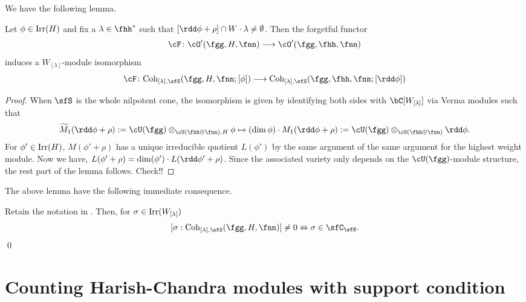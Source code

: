 \documentclass[counting_main.tex]{subfiles}
\begin{document}
We have the following lemma.
\begin{lem}
  Let $\phi\in \mathrm{Irr}(H)$ and fix a $\lambda\in \fhh^{*}$ such that
  $[\rdd \phi + \rho ]\cap W\cdot \lambda\neq \emptyset$.
  Then the forgetful functor
  \[
    \cF\colon \cO'(\fgg,H,\fnn)\longrightarrow \cO'(\fgg,\fhh,\fnn)
  \]
  induces a $W_{[\lambda]}$-module isomorphism
  \[
    \cF\colon \Coh_{[\lambda],\sfS}(\fgg,H,\fnn;[\phi])\longrightarrow
    \Coh_{[\lambda],\sfS}(\fgg,\fhh,\fnn;[\rdd\phi])
  \]
\end{lem}
\begin{proof}
  When $\sfS$ is the whole nilpotent cone, the isomorphism is
  given by identifying both sides with $\bC[W_{[\lambda]}]$ via Verma modules
  such that
  \[
  \wtM_{1}(\rdd \phi+\rho):=\cU(\fgg)\otimes_{\cU(\fhh\oplus\fnn),H}\phi
  \mapsto (\dim\phi)\cdot M_{1}(\rdd\phi+\rho):= \cU(\fgg)\otimes_{\cU(\fhh\oplus\fnn)}\rdd\phi.
  \]
  For $\phi'\in \mathrm{Irr}(H)$, $M(\phi'+\rho)$ has a unique irreducible quotient
  $L(\phi')$ by the same argument of the same argument for the highest weight module.   Now we have, $L(\phi'+\rho) = \dim(\phi')\cdot L(\rdd\phi'+\rho)$.
  Since the associated variety only depends on the $\cU(\fgg)$-module structure,
  the rest part of the lemma follows.   {\color{red} Check!!}
\end{proof}


The above lemma have the following immediate consequence.
\begin{cor}
  Retain the notation in . Then, for $\sigma\in \mathrm{Irr}(W_{[\lambda]})$
  \[
[\sigma:\Coh_{[\lambda],\sfS}(\fgg,H,\fnn)] \neq 0 \Leftrightarrow
  \sigma\in \sfC_{\sfS}.
  \]   \qed
\end{cor}



\section{Counting Harish-Chandra modules with support condition}
\end{document}

